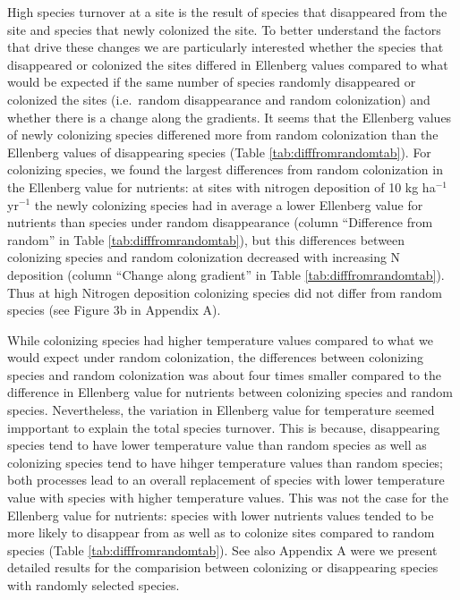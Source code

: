 \documentclass[fleqn,10pt,lineno]{wlpeerj} %
\theoremstyle{definition}
\theoremstyle{definition}
\theoremstyle{definition}
\theoremstyle{remark}
\begin{document}
High species turnover at a site is the result of species that
disappeared from the site and species that newly colonized the site. To
better understand the factors that drive these changes we are
particularly interested whether the species that disappeared or
colonized the sites differed in Ellenberg values compared to what would
be expected if the same number of species randomly disappeared or
colonized the sites (i.e.~random disappearance and random colonization)
and whether there is a change along the gradients. It seems that the
Ellenberg values of newly colonizing species differened more from random
colonization than the Ellenberg values of disappearing species (Table
\ref{tab:difffromrandomtab}). For colonizing species, we found the
largest differences from random colonization in the Ellenberg value for
nutrients: at sites with nitrogen deposition of 10 kg ha\(^{-1}\)
yr\(^{-1}\) the newly colonizing species had in average a lower
Ellenberg value for nutrients than species under random disappearance
(column ``Difference from random'' in Table
\ref{tab:difffromrandomtab}), but this differences between colonizing
species and random colonization decreased with increasing N deposition
(column ``Change along gradient'' in Table \ref{tab:difffromrandomtab}).
Thus at high Nitrogen deposition colonizing species did not differ from
random species (see Figure 3b in Appendix A).

While colonizing species had higher temperature values compared to what
we would expect under random colonization, the differences between
colonizing species and random colonization was about four times smaller
compared to the difference in Ellenberg value for nutrients between
colonizing species and random species. Nevertheless, the variation in
Ellenberg value for temperature seemed impportant to explain the total
species turnover. This is because, disappearing species tend to have
lower temperature value than random species as well as colonizing
species tend to have hihger temperature values than random species; both
processes lead to an overall replacement of species with lower
temperature value with species with higher temperature values. This was
not the case for the Ellenberg value for nutrients: species with lower
nutrients values tended to be more likely to disappear from as well as
to colonize sites compared to random species (Table
\ref{tab:difffromrandomtab}). See also Appendix A were we present
detailed results for the comparision between colonizing or disappearing
species with randomly selected species.
\end{document}
